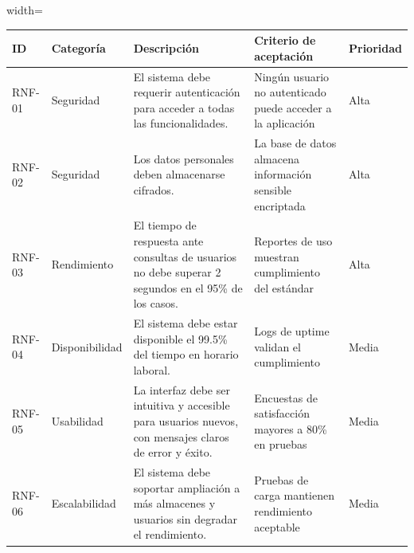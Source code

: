 \documentclass[12pt]{article} %
\begin{document}
\thispagestyle{plain}
  \footnotesize %
  \renewcommand{\arraystretch}{3} %
  
  \begin{adjustbox}{width=\linewidth}
    \begin{tabularx}{\linewidth}{|>{\centering\arraybackslash}p{1.3cm}|
      >{\centering\arraybackslash}p{2.1cm}|
      >{\centering\arraybackslash}p{5.1cm}|
      >{\centering\arraybackslash}p{4.1cm}|
      >{\centering\arraybackslash}p{1.7cm}|}
\hline
      \rowcolor{headerbg} %
      \textbf{ID} & \textbf{Categoría} & \textbf{Descripción} & \textbf{Criterio de aceptación} & \textbf{Prioridad}\\
      \hline
      RNF-01 & Seguridad & El sistema debe requerir autenticación para acceder a todas las funcionalidades. & Ningún usuario no autenticado puede acceder a la aplicación & Alta \\
      \hline
      RNF-02 & Seguridad & Los datos personales deben almacenarse cifrados. & La base de datos almacena información sensible encriptada & Alta \\
      \hline
      RNF-03 & Rendimiento & El tiempo de respuesta ante consultas de usuarios no debe superar 2 segundos en el 95\% de los casos. & Reportes de uso muestran cumplimiento del estándar & Alta \\
      \hline
      RNF-04 & Disponibilidad & El sistema debe estar disponible el 99.5\% del tiempo en horario laboral. & Logs de uptime validan el cumplimiento & Media \\
      \hline
      RNF-05 & Usabilidad & La interfaz debe ser intuitiva y accesible para usuarios nuevos, con mensajes claros de error y éxito. & Encuestas de satisfacción mayores a 80\% en pruebas & Media \\
      \hline
      RNF-06 & Escalabilidad & El sistema debe soportar ampliación a más almacenes y usuarios sin degradar el rendimiento. & Pruebas de carga mantienen rendimiento aceptable & Media \\
      \hline
    \end{tabularx}
  \end{adjustbox}
  \normalsize

  \thispagestyle{plain}
  \footnotesize %
  \renewcommand{\arraystretch}{3} %
  
\end{document}
